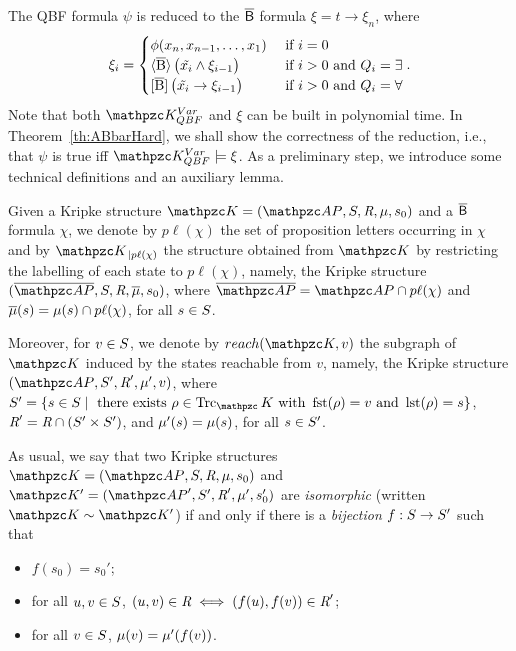 The QBF formula $\psi$ is reduced to the $\mathsf{\overline{B}}$ formula $\xi=t\rightarrow \xi_n$, where
\begin{equation*}
\xi_i=
\begin{cases}
\phi(x_n,x_{n-1},\ldots ,x_1) & \text{ if } i=0\\
\operatorname{\langle \overline{B}\rangle}\big(\tilde{x_i} \wedge \xi_{i-1}\big) & \text{ if } i>0 \text{ and }  Q_i=\exists\\
\operatorname{\mathopen[ \overline{B} \mathclose]}\big(\tilde{x_i} \rightarrow \xi_{i-1}\big) & \text{ if } i>0 \text{ and }  Q_i=\forall
\end{cases}.
\end{equation*}
Note that both $\Ku_{QBF}^{Var}$ and $\xi$ can be built in polynomial time. 
%
In Theorem~\ref{th:ABbarHard}, we shall show the correctness of the reduction, i.e., that $\psi$
is true iff $\Ku_{QBF}^{Var}\models\xi$.
%
As a preliminary step, we introduce some technical definitions and an auxiliary lemma.

Given a Kripke structure $\Ku=\KuDef$ and a $\mathsf{\overline{B}}$ formula $\chi$, we denote by $p\ell(\chi)$ the set of proposition letters occurring in $\chi$ and by $\Ku_{\,|p\ell(\chi)}$ the 
structure obtained from $\Ku$ by restricting the labelling of each state to $p\ell(\chi)$, namely, the 
Kripke 
structure $(\overline{\Prop},\States, \Edges,\overline{\Lab},s_0)$, where $\overline{\Prop}=\Prop\cap p\ell(\chi)$ and $\overline{\mu}(s)=\mu(s)\cap p\ell(\chi)$, for all $s\in S$.

Moreover, for $v\in S$, we denote by $reach(\Ku,v)$ the subgraph of $\Ku$ induced by the states reachable from $v$, namely, the 
Kripke 
structure $(\Prop,\States',\Edges',\Lab',v)$, where $\States'=\{s\in \States \mid \text{ there exists } \rho\in \Trk_\Ku \text{ with } \fst(\rho)=v \text{ and } \lst(\rho)=s\}$, $\textit{R}'=\textit{R} \cap (S'\times S')$, and $\mu'(s)=\mu(s)$, for all $s\in S'$. %

As usual, we say that two Kripke structures $\Ku=\KuDef$ and $\Ku'=(\Prop',\States', \Edges',\Lab',\sinit')$ are \emph{isomorphic} (written $\Ku\sim \Ku'$) if and only if there is a \emph{bijection} $f:S\to S'$ such that 
\begin{itemize}
    \item $f(s_0)=s_0'$;
    \item for all $u,v\in S$, $(u,v)\in \textit{R} \iff (f(u),f(v))\in\textit{R}'$;
    \item for all $v\in S$, $\mu(v)=\mu'(f(v))$.
\end{itemize}

